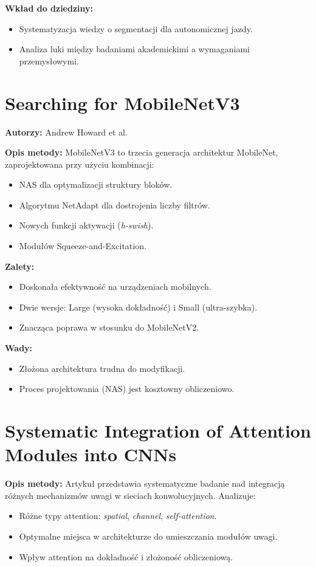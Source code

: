 \textbf{Wkład do dziedziny:}
\begin{itemize}
    \item Systematyzacja wiedzy o segmentacji dla autonomicznej jazdy.
    \item Analiza luki między badaniami akademickimi a wymaganiami przemysłowymi.
\end{itemize}

\section{Searching for MobileNetV3}
\textbf{Autorzy:} Andrew Howard et al.

\textbf{Opis metody:}
MobileNetV3 to trzecia generacja architektur MobileNet, zaprojektowana przy użyciu kombinacji:
\begin{itemize}
    \item NAS dla optymalizacji struktury bloków.
    \item Algorytmu NetAdapt dla dostrojenia liczby filtrów.
    \item Nowych funkcji aktywacji (\textit{h-swish}).
    \item Modułów Squeeze-and-Excitation.
\end{itemize}

\textbf{Zalety:}
\begin{itemize}
    \item Doskonała efektywność na urządzeniach mobilnych.
    \item Dwie wersje: Large (wysoka dokładność) i Small (ultra-szybka).
    \item Znacząca poprawa w stosunku do MobileNetV2.
\end{itemize}

\textbf{Wady:}
\begin{itemize}
    \item Złożona architektura trudna do modyfikacji.
    \item Proces projektowania (NAS) jest kosztowny obliczeniowo.
\end{itemize}

\section{Systematic Integration of Attention Modules into CNNs}
\textbf{Opis metody:}
Artykuł przedstawia systematyczne badanie nad integracją różnych mechanizmów uwagi w sieciach konwolucyjnych. Analizuje:
\begin{itemize}
    \item Różne typy attention: \textit{spatial}, \textit{channel}, \textit{self-attention}.
    \item Optymalne miejsca w architekturze do umieszczania modułów uwagi.
    \item Wpływ attention na dokładność i złożoność obliczeniową.
\end{itemize}

